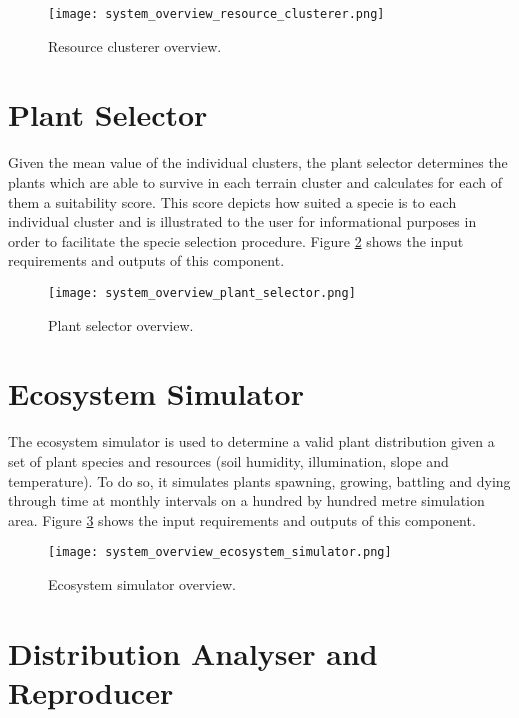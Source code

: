 \begin{figure}
\center
	\texttt{[image: system\_overview\_resource\_clusterer.png]}
	\caption{ Resource clusterer overview.}	
	\label{fig:system_overview_resoure_clusterer}
\end{figure}

\section{Plant Selector}

Given the mean value of the individual clusters, the plant selector determines the plants which are able to survive in each terrain cluster and calculates for each of them a suitability score. This score depicts how suited a specie is to each individual cluster and is illustrated to the user for informational purposes in order to facilitate the specie selection procedure. Figure \ref{fig:system_overview_plant_selector} shows the input requirements and outputs of this component.

\begin{figure}
\center
	\texttt{[image: system\_overview\_plant\_selector.png]}
	\caption{ Plant selector overview.}	
	\label{fig:system_overview_plant_selector}
\end{figure}

\section{Ecosystem Simulator}

The ecosystem simulator is used to determine a valid plant distribution given a set of plant species and resources (soil humidity, illumination, slope and temperature). To do so, it simulates plants spawning, growing, battling and dying through time at monthly intervals on a hundred by hundred metre simulation area. Figure \ref{fig:system_overview_ecosystem_simulator} shows the input requirements and outputs of this component.

\begin{figure}
\center
	\texttt{[image: system\_overview\_ecosystem\_simulator.png]}
	\caption{ Ecosystem simulator overview.}	
	\label{fig:system_overview_ecosystem_simulator}
\end{figure}

\section{Distribution Analyser and Reproducer}

